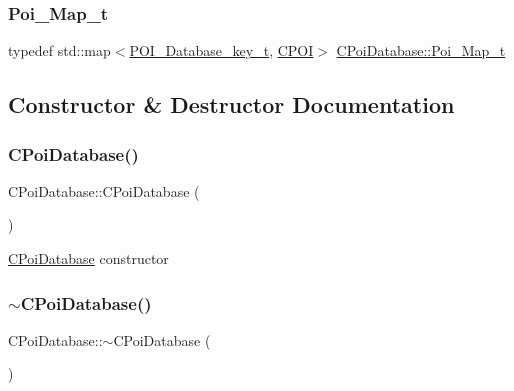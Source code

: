 \mbox{\label{classCPoiDatabase_ad9ed38adc9bf4250e704cd3d378176a2}} 
\subsubsection{\texorpdfstring{Poi\+\_\+\+Map\+\_\+t}{Poi\_Map\_t}}
{\footnotesize\ttfamily typedef std\+::map$<$\hyperlink{CPoiDatabase_8h_ad55418fc31c1491ccfbd50da54f494a0}{P\+O\+I\+\_\+\+Database\+\_\+key\+\_\+t}, \hyperlink{classCPOI}{C\+P\+OI}$>$ \hyperlink{classCPoiDatabase_ad9ed38adc9bf4250e704cd3d378176a2}{C\+Poi\+Database\+::\+Poi\+\_\+\+Map\+\_\+t}}



\subsection{Constructor \& Destructor Documentation}
\mbox{\label{classCPoiDatabase_a03098c79d2c4958e353658127fa0535e}} 
\subsubsection{\texorpdfstring{C\+Poi\+Database()}{CPoiDatabase()}}
{\footnotesize\ttfamily C\+Poi\+Database\+::\+C\+Poi\+Database (\begin{DoxyParamCaption}{ }\end{DoxyParamCaption})}

\hyperlink{classCPoiDatabase}{C\+Poi\+Database} constructor \mbox{\label{classCPoiDatabase_a01b246bbd0dfa5bf3c94e97b09df92b2}} 
\subsubsection{\texorpdfstring{$\sim$\+C\+Poi\+Database()}{~CPoiDatabase()}}
{\footnotesize\ttfamily C\+Poi\+Database\+::$\sim$\+C\+Poi\+Database (\begin{DoxyParamCaption}{ }\end{DoxyParamCaption})}

